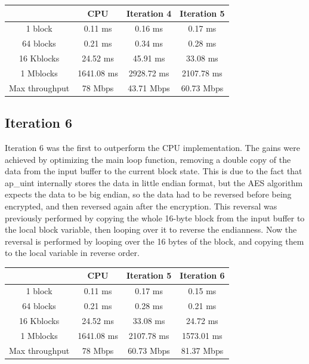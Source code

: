 \documentclass[12pt,oneside,a4paper]{article}
\begin{document}
\begin{table}[H]
	\centering
	\begin{tabular}{cccc}
		\toprule
		 & CPU & Iteration 4 & Iteration 5 \\
		\midrule
		1 block & 0.11 ms & 0.16 ms & 0.17 ms \\
		64 blocks & 0.21 ms & 0.34 ms & 0.28 ms \\
		16 Kblocks & 24.52 ms & 45.91 ms & 33.08 ms \\
		1 Mblocks & 1641.08 ms & 2928.72 ms & 2107.78 ms \\
		Max throughput & 78 Mbps & 43.71 Mbps & 60.73 Mbps \\
		\bottomrule
	\end{tabular}
\end{table}

\subsection{Iteration 6} \label{subsec:iter6}
Iteration 6 was the first to outperform the CPU implementation. The gains were achieved by optimizing the main loop function, removing a double copy of the data from the input buffer to the current block state.
This is due to the fact that ap\_uint internally stores the data in little endian format, but the AES algorithm expects the data to be big endian, so the data had to be reversed before being encrypted, and then reversed again after the encryption.
This reversal was previously performed by copying the whole 16-byte block from the input buffer to the local block variable, then looping over it to reverse the endianness.
Now the reversal is performed by looping over the 16 bytes of the block, and copying them to the local variable in reverse order.

\begin{table}[h!]
	\centering
	\begin{tabular}{cccc}
		\toprule
		 & CPU & Iteration 5 & Iteration 6 \\
		\midrule
		1 block & 0.11 ms & 0.17 ms & 0.15 ms \\
		64 blocks & 0.21 ms & 0.28 ms & 0.21 ms \\
		16 Kblocks & 24.52 ms & 33.08 ms & 24.72 ms \\
		1 Mblocks & 1641.08 ms & 2107.78 ms & 1573.01 ms \\
		Max throughput & 78 Mbps & 60.73 Mbps & 81.37 Mbps \\
		\bottomrule
	\end{tabular}
\end{table}
\end{document}
